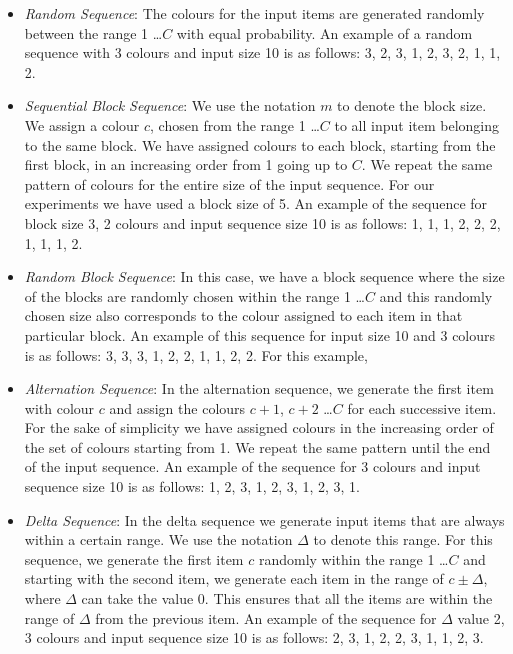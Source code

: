 \begin{itemize}
\item \textit{Random Sequence}: The colours for the input items are generated randomly between the range 1 \ldots $C$ with equal probability. An example of a random sequence with 3 colours and input size 10 is as follows: 3, 2, 3, 1, 2, 3, 2, 1, 1, 2. 
\item \textit{Sequential Block Sequence}: We use the notation $m$ to denote the block size. We assign a colour $c$, chosen from the range 1 \ldots $C$ to all input item belonging to the same block. We have assigned colours to each block, starting from the first block, in an increasing order from 1 going up to $C$. We repeat the same pattern of colours for the entire size of the input sequence. For our experiments we have used a block size of 5. An example of the sequence for block size 3, 2 colours and input sequence size 10 is as follows: 1, 1, 1, 2, 2, 2, 1, 1, 1, 2. 
\item \textit{Random Block Sequence}: In this case, we have a block sequence where the size of the blocks are randomly chosen within the range 1 \ldots $C$ and this randomly chosen size also corresponds to the colour assigned to each item in that particular block. An example of this sequence for input size 10 and 3 colours is as follows: 3, 3, 3, 1, 2, 2, 1, 1, 2, 2. For this example, 
\item \textit{Alternation Sequence}: In the alternation sequence, we generate the first item with colour $c$ and assign the colours $c + 1$, $c + 2$ \ldots $C$ for each successive item. For the sake of simplicity we have assigned  colours in the increasing order of the set of colours starting from 1. We repeat the same pattern until the end of the input sequence. An example of the sequence for 3 colours and input sequence size 10 is as follows: 1, 2, 3, 1, 2, 3, 1, 2, 3, 1. 
\item \textit{Delta Sequence}: In the delta sequence we generate input items that are always within a certain range. We use the notation $\Delta$ to denote this range. For this sequence, we generate the first item $c$ randomly within the range 1 \ldots $C$ and starting with the second item, we generate each item in the range of $c \pm \Delta$, where $\Delta$ can take the value 0. This ensures that all the items are within the range of $\Delta$ from the previous item. An example of the sequence for $\Delta$ value 2, 3 colours and input sequence size 10 is as follows: 2, 3, 1, 2, 2, 3, 1, 1, 2, 3. 
\end{itemize}

